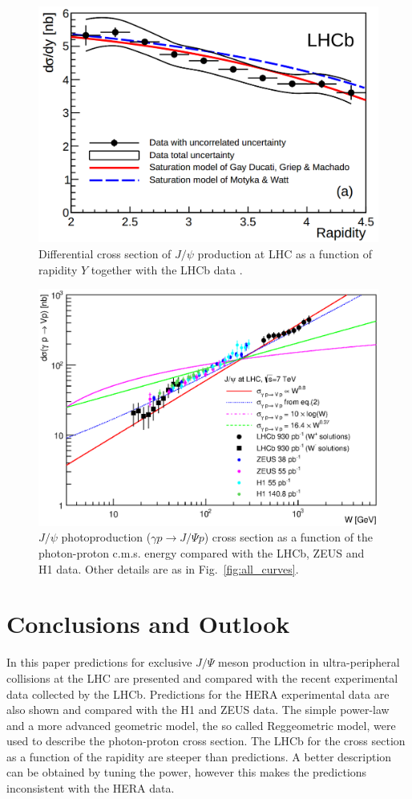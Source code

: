 \documentclass[12pt]{article}
\begin{document}
\begin{figure}[p]
\centering
 \includegraphics[width=.8\textwidth]{figures/Magno.png}
 \caption{Differential cross section of $J/\psi$ production at LHC as a function of rapidity $Y$ together with the LHCb data \cite{LHCb2}.}
 \label{fig:dipole}
\end{figure}

\clearpage

\begin{figure}[!t]
\centering
 \includegraphics[width=.8\textwidth]{figures/sigma_gamma_p_W_all_theory.eps}
 \caption{$J/\psi$ photoproduction ($\gamma p \to J/\Psi p$) cross section as a function of the photon-proton c.m.s. energy compared
           with the LHCb, ZEUS and H1 data. Other details are as in Fig.~\ref{fig:all_curves}.}
 \label{fig:all_curves_w}
\end{figure}

\section{Conclusions and Outlook}

In this paper predictions for exclusive $J/\Psi$ meson production in ultra-peripheral collisions at the LHC are presented and compared with the recent experimental data collected by the LHCb.
Predictions for the HERA  experimental data are also shown and compared with the H1 and ZEUS data.
The simple power-law and a more advanced geometric model, the so called Reggeometric model, were used to describe the photon-proton cross section.
The LHCb for the cross section as a function of the rapidity are steeper than predictions. A better description can be obtained by tuning the power,
however this makes the predictions inconsistent with the HERA data. 
\end{document}
